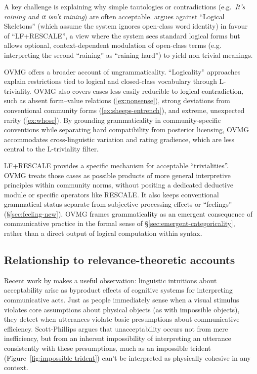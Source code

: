 \documentclass[12pt,letterpaper]{article}
\newcommand{\mention}[1]{\textit{#1}}
\begin{document}
A key challenge is explaining why simple tautologies or contradictions (e.g.\, \mention{It's raining and it isn't raining}) are often acceptable. \textcite{del_pinal_logicality_2019} argues against \enquote{Logical Skeletons} (which assume the system ignores open-class word identity) in favour of \enquote{LF+RESCALE}, a view where the system sees standard logical forms but allows optional, context-dependent modulation of open-class terms (e.g.\, interpreting the second \enquote{raining} as \enquote{raining hard}) to yield non-trivial meanings.

OVMG offers a broader account of ungrammaticality. \enquote{Logicality} approaches explain restrictions tied to logical and closed-class vocabulary through L-triviality. OVMG also covers cases less easily reducible to logical contradiction, such as absent form--value relations (\ref{ex:nonsense}), strong deviations from conventional community forms (\ref{ex:sheeps-entrench}), and extreme, unexpected rarity (\ref{ex:whose}). By grounding grammaticality in community-specific conventions while separating hard compatibility from posterior licensing, OVMG accommodates cross-linguistic variation and rating gradience, which are less central to the L-triviality filter.

LF+RESCALE provides a specific mechanism for acceptable \enquote{trivialities}. OVMG treats those cases as possible products of more general interpretive principles within community norms, without positing a dedicated deductive module or specific operators like RESCALE. It also keeps conventional grammatical status separate from subjective processing effects or \enquote{feelings} (\S\ref{sec:feeling-new}). OVMG frames grammaticality as an emergent consequence of communicative practice in the formal sense of \S\ref{sec:emergent-categoricality}, rather than a direct output of logical computation within syntax.



\subsection{Relationship to relevance-theoretic accounts}

Recent work by \textcite{scottphillips2024communication} makes a useful observation: linguistic intuitions about acceptability arise as byproduct effects of cognitive systems for interpreting communicative acts. Just as people immediately sense when a visual stimulus violates core assumptions about physical objects (as with impossible objects), they detect when utterances violate basic presumptions about communicative efficiency. Scott-Phillips argues that unacceptability occurs not from mere inefficiency, but from an inherent impossibility of interpreting an utterance consistently with these presumptions, much as an impossible trident (Figure~\ref{fig:impossible trident}) can't be interpreted as physically cohesive in any context.
\end{document}

